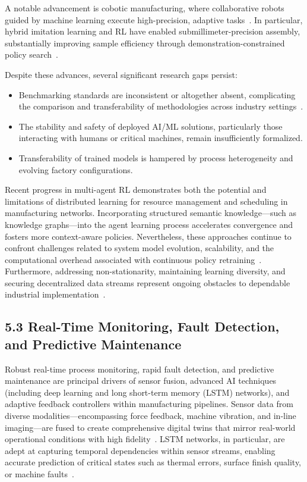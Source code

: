 \documentclass[11pt]{article}
\begin{document}
A notable advancement is cobotic manufacturing, where collaborative robots guided by machine learning execute high-precision, adaptive tasks~\cite{ref42,ref44,ref45}. In particular, hybrid imitation learning and RL have enabled submillimeter-precision assembly, substantially improving sample efficiency through demonstration-constrained policy search~\cite{ref44}.

Despite these advances, several significant research gaps persist:
\begin{itemize}
    \item Benchmarking standards are inconsistent or altogether absent, complicating the comparison and transferability of methodologies across industry settings~\cite{ref56}.
    \item The stability and safety of deployed AI/ML solutions, particularly those interacting with humans or critical machines, remain insufficiently formalized.
    \item Transferability of trained models is hampered by process heterogeneity and evolving factory configurations.
\end{itemize}

Recent progress in multi-agent RL demonstrates both the potential and limitations of distributed learning for resource management and scheduling in manufacturing networks. Incorporating structured semantic knowledge—such as knowledge graphs—into the agent learning process accelerates convergence and fosters more context-aware policies. Nevertheless, these approaches continue to confront challenges related to system model evolution, scalability, and the computational overhead associated with continuous policy retraining~\cite{ref13,ref30}. Furthermore, addressing non-stationarity, maintaining learning diversity, and securing decentralized data streams represent ongoing obstacles to dependable industrial implementation~\cite{ref13,ref56}.

\subsection{5.3 Real-Time Monitoring, Fault Detection, and Predictive Maintenance}

Robust real-time process monitoring, rapid fault detection, and predictive maintenance are principal drivers of sensor fusion, advanced AI techniques (including deep learning and long short-term memory (LSTM) networks), and adaptive feedback controllers within manufacturing pipelines. Sensor data from diverse modalities—encompassing force feedback, machine vibration, and in-line imaging—are fused to create comprehensive digital twins that mirror real-world operational conditions with high fidelity~\cite{ref2,ref5,ref6,ref7,ref15,ref20,ref27,ref44,ref47,ref48,ref58,ref59}. LSTM networks, in particular, are adept at capturing temporal dependencies within sensor streams, enabling accurate prediction of critical states such as thermal errors, surface finish quality, or machine faults~\cite{ref5,ref15,ref48,ref59}.
\end{document}
